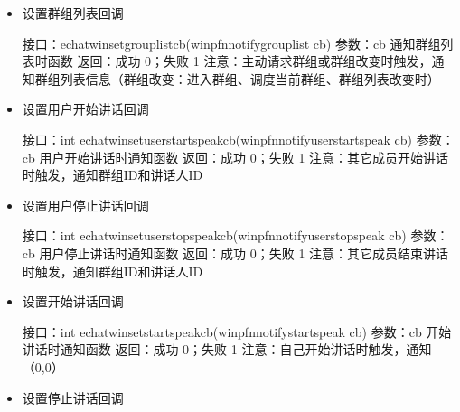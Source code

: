 \documentclass[letterpaper,10pt,english]{sphinxmanual}
\begin{document}
\begin{itemize}
\item {} 
设置群组列表回调

%
\begin{sphinxVerbatim}[commandchars=\\\{\}]
接口：echat\PYGZus{}win\PYGZus{}set\PYGZus{}grouplist\PYGZus{}cb(win\PYGZus{}pfn\PYGZus{}notify\PYGZus{}grouplist cb)
参数：cb 通知群组列表时函数
返回：成功 0；失败 \PYGZhy{}1
注意：主动请求群组或群组改变时触发，通知群组列表信息（群组改变：进入群组、调度当前群组、群组列表改变时）
\end{sphinxVerbatim}

\item {} 
设置用户开始讲话回调

%
\begin{sphinxVerbatim}[commandchars=\\\{\}]
接口：int echat\PYGZus{}win\PYGZus{}set\PYGZus{}user\PYGZus{}start\PYGZus{}speak\PYGZus{}cb(win\PYGZus{}pfn\PYGZus{}notify\PYGZus{}user\PYGZus{}start\PYGZus{}speak cb)
参数：cb 用户开始讲话时通知函数
返回：成功 0；失败 \PYGZhy{}1
注意：其它成员开始讲话时触发，通知群组ID和讲话人ID
\end{sphinxVerbatim}

\item {} 
设置用户停止讲话回调

%
\begin{sphinxVerbatim}[commandchars=\\\{\}]
接口：int echat\PYGZus{}win\PYGZus{}set\PYGZus{}user\PYGZus{}stop\PYGZus{}speak\PYGZus{}cb(win\PYGZus{}pfn\PYGZus{}notify\PYGZus{}user\PYGZus{}stop\PYGZus{}speak cb)
参数：cb 用户停止讲话时通知函数
返回：成功 0；失败 \PYGZhy{}1
注意：其它成员结束讲话时触发，通知群组ID和讲话人ID
\end{sphinxVerbatim}

\item {} 
设置开始讲话回调

%
\begin{sphinxVerbatim}[commandchars=\\\{\}]
接口：int echat\PYGZus{}win\PYGZus{}set\PYGZus{}start\PYGZus{}speak\PYGZus{}cb(win\PYGZus{}pfn\PYGZus{}notify\PYGZus{}start\PYGZus{}speak cb)
参数：cb 开始讲话时通知函数
返回：成功 0；失败 \PYGZhy{}1
注意：自己开始讲话时触发，通知（0,0）
\end{sphinxVerbatim}

\item {} 
设置停止讲话回调


\end{itemize}
\end{document}
